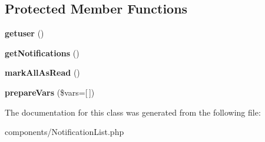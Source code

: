 \subsection*{Protected Member Functions}
\begin{DoxyCompactItemize}
\item 
\hypertarget{classDMA_1_1Friends_1_1Components_1_1NotificationList_a074dd7aca870f19ec427cd5a5d7ac251}{{\bfseries getuser} ()}\label{classDMA_1_1Friends_1_1Components_1_1NotificationList_a074dd7aca870f19ec427cd5a5d7ac251}

\item 
\hypertarget{classDMA_1_1Friends_1_1Components_1_1NotificationList_adc479f44c9f83683592e2b9bbfc8d814}{{\bfseries get\+Notifications} ()}\label{classDMA_1_1Friends_1_1Components_1_1NotificationList_adc479f44c9f83683592e2b9bbfc8d814}

\item 
\hypertarget{classDMA_1_1Friends_1_1Components_1_1NotificationList_a5eef82282d782ab43559e31143472542}{{\bfseries mark\+All\+As\+Read} ()}\label{classDMA_1_1Friends_1_1Components_1_1NotificationList_a5eef82282d782ab43559e31143472542}

\item 
\hypertarget{classDMA_1_1Friends_1_1Components_1_1NotificationList_a2e4271c838bd10f2790ae7ac1cb83638}{{\bfseries prepare\+Vars} (\$vars=\mbox{[}$\,$\mbox{]})}\label{classDMA_1_1Friends_1_1Components_1_1NotificationList_a2e4271c838bd10f2790ae7ac1cb83638}

\end{DoxyCompactItemize}


The documentation for this class was generated from the following file\+:\begin{DoxyCompactItemize}
\item 
components/Notification\+List.\+php\end{DoxyCompactItemize}
